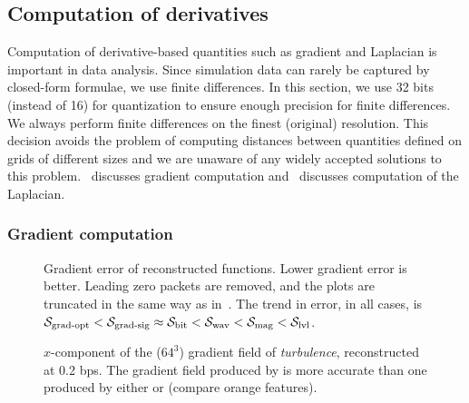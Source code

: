 \subsection{Computation of derivatives} \label{sec:derivatives}

Computation of derivative-based quantities such as gradient and Laplacian is important in data analysis.
Since simulation data can rarely be captured by closed-form formulae, we use finite differences. In
this section, we use 32 bits (instead of 16) for quantization to ensure enough precision for finite
differences. We always perform finite differences on the finest (original) resolution. This decision
avoids the problem of computing distances between quantities defined on grids of different sizes and
we are unaware of any widely accepted solutions to this problem.~
discusses gradient computation and~ discusses computation of the Laplacian.

\subsubsection{Gradient computation} \label{sec:gradient}

\begin{figure*}[t]
\centering
{}
\caption{Gradient error of reconstructed functions. Lower gradient error is better. Leading zero
packets are removed, and the plots are truncated in the same way as in~.
The trend in error, in all cases, is $\sgop < \sgsg \approx \sbit < \swav < \smag < \slvl$.}
\label{fig:gradient-error-comparison}
\vspace{1em}

\centering
{}
\caption{$x$-component of the ($64^3$) gradient field of \emph{turbulence}, reconstructed at 0.2
bps. The gradient field produced by \sbit is more accurate than one produced by either \swav or
\sgsg (compare orange features).}
\label{fig:gradient-rendering-diff}
\end{figure*}

